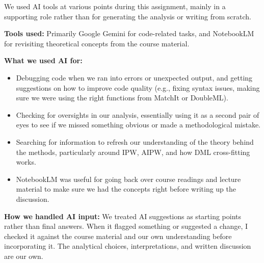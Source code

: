 \documentclass[12pt,a4paper]{article}
\begin{document}
We used AI tools at various points during this assignment, mainly in a supporting role rather than for generating the analysis or writing from scratch.

\textbf{Tools used:} Primarily Google Gemini for code-related tasks, and NotebookLM for revisiting theoretical concepts from the course material.

\textbf{What we used AI for:}
\begin{itemize}
\item Debugging code when we ran into errors or unexpected output, and getting suggestions on how to improve code quality (e.g., fixing syntax issues, making sure we were using the right functions from MatchIt or DoubleML).
\item Checking for oversights in our analysis, essentially using it as a second pair of eyes to see if we missed something obvious or made a methodological mistake.
\item Searching for information to refresh our understanding of the theory behind the methods, particularly around IPW, AIPW, and how DML cross-fitting works.
\item NotebookLM was useful for going back over course readings and lecture material to make sure we had the concepts right before writing up the discussion.
\end{itemize}

\textbf{How we handled AI input:} We treated AI suggestions as starting points rather than final answers. When it flagged something or suggested a change, I checked it against the course material and our own understanding before incorporating it. The analytical choices, interpretations, and written discussion are our own.
\end{document}
